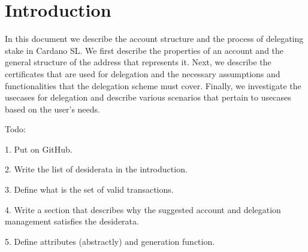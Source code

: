\section{Introduction}

In this document we describe the account structure and the process of delegating stake in Cardano SL. We first describe the properties of an account and the general structure of the address that represents it. Next, we describe the certificates that are used for delegation and the necessary assumptions and functionalities that the delegation scheme must cover. Finally, we investigate the usecases for delegation and describe various scenarios that pertain to usecases based on the user's needs.


Todo: 

1. Put on GitHub. 

2. Write the list of desiderata in the introduction. 

3. Define what is the set of valid transactions. 

4. Write a section that describes why the suggested account and delegation management 
satisfies the desiderata. 

5. Define attributes (abstractly) and generation function. 